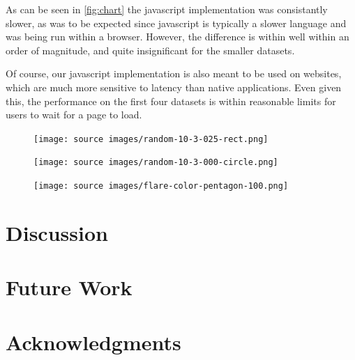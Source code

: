\documentclass{acm_proc_article-sp} \usepackage{cite}
\begin{document}
As can be seen in \ref{fig:chart} the javascript implementation was
consistantly slower, as was to be expected since javascript is
typically a slower language and was being run within a
browser. However, the difference is within well within an order of
magnitude, and quite insignificant for the smaller datasets.

Of course, our javascript implementation is also meant to be used on
websites, which are much more sensitive to latency than native
applications. Even given this, the performance on the first four
datasets is within reasonable limits for users to wait for a page to
load.

\begin{figure}
\centering \texttt{[image: source
  images/random-10-3-025-rect.png]}
\caption{}
\end{figure}
\begin{figure}
\centering \texttt{[image: source
  images/random-10-3-000-circle.png]}
\caption{}
\end{figure}
\begin{figure}
\centering \texttt{[image: source
  images/flare-color-pentagon-100.png]}
\caption{}
\end{figure}


\section{Discussion}
\label{sec:discussion}

\section{Future Work}
\label{sec:future}


\section{Acknowledgments}
\label{sec:acknowledgements}




{} 
\end{document}
